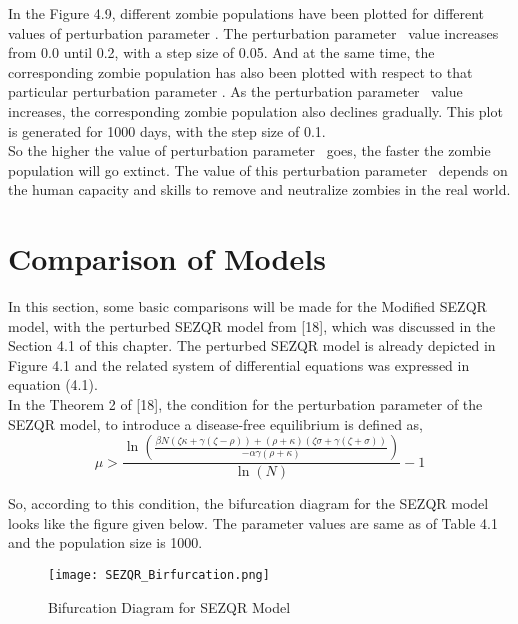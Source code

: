 In the Figure 4.9, different zombie populations have been plotted for different values of perturbation parameter \textmu. The perturbation parameter \textmu \ value increases from 0.0 until 0.2, with a step size of 0.05. And at the same time, the corresponding zombie population has also been plotted with respect to that particular perturbation parameter \textmu. As the perturbation parameter \textmu \ value increases, the corresponding zombie population also declines gradually. This plot is generated for 1000 days, with the step size of 0.1. \\

So the higher the value of perturbation parameter \textmu \ goes, the faster the zombie population will go extinct. The value of this perturbation parameter \textmu \ depends on the human capacity and skills to remove and neutralize zombies in the real world.

\pagebreak
\section{Comparison of Models}

In this section, some basic comparisons will be made for the Modified SEZQR model, with the perturbed SEZQR model from [18], which was discussed in the Section 4.1 of this chapter. The perturbed SEZQR model is already depicted in Figure 4.1 and the related system of differential equations was expressed in equation (4.1). \\

In the Theorem 2 of [18], the condition for the perturbation parameter of the SEZQR model, to introduce a disease-free equilibrium is defined as, \\

\begin{equation}
\mu>\frac{\ln \left(\frac{\beta N(\zeta \kappa+\gamma(\zeta-\rho))+(\rho+\kappa)(\zeta \sigma+\gamma(\zeta+\sigma))}{-\alpha \gamma(\rho+\kappa)}\right)}{\ln (N)}-1
\end{equation}

So, according to this condition, the bifurcation diagram for the SEZQR model looks like the figure given below. The parameter values are same as of Table 4.1 and the population size is 1000. \\

\begin{figure}[H]
\centering
\texttt{[image: SEZQR\_Birfurcation.png]}
\caption{Bifurcation Diagram for SEZQR Model}
\label{fig:Bifurcation SEZQR}
\end{figure}

